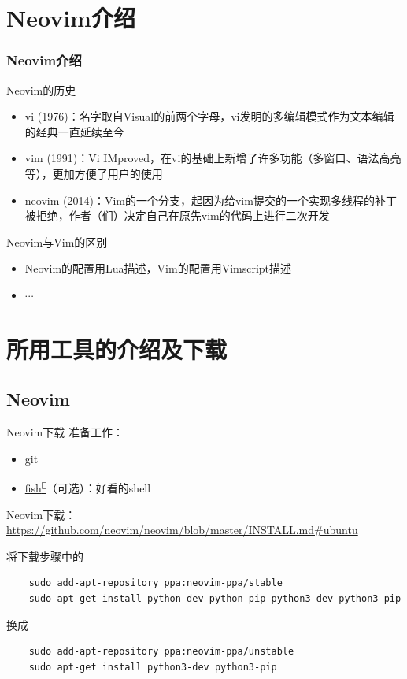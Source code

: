 \documentclass[aspectratio=169]{ctexbeamer}
\newcommand{\nerd}[1]{\texttt{#1}}
\newcommand{\refnote}[1]{\footnotetext{#1}}
\newcommand{\link}[3][]{\href{#3}{#2\textsuperscript{\nerd{}}}}
\begin{document}
\section{Neovim介绍}
  \begin{frame}\frametitle{Neovim介绍}
    Neovim的历史
    \begin{itemize}
      \item vi (1976)：名字取自Visual的前两个字母，vi发明的多编辑模式作为文本编辑的经典一直延续至今 %
      \item vim (1991)：Vi IMproved，在vi的基础上新增了许多功能（多窗口、语法高亮等），更加方便了用户的使用 %
      \item neovim (2014)：Vim的一个分支，起因为给vim提交的一个实现多线程的补丁被拒绝，作者（们）决定自己在原先vim的代码上进行二次开发
    \end{itemize}
    Neovim与Vim的区别
    \begin{itemize}
      \item Neovim的配置用Lua描述，Vim的配置用Vimscript描述
      \item \( \cdots \)
    \end{itemize}

    \refnote{Reference:}
  \end{frame}

\section{所用工具的介绍及下载}
  \subsection{Neovim}
    \begin{frame}[containsverbatim]{Neovim下载}
      准备工作：
      \begin{itemize}
        \item git
        \item \link{fish}{https://fishshell.com/}（可选）：好看的shell
      \end{itemize}

      Neovim下载： \url{https://github.com/neovim/neovim/blob/master/INSTALL.md\#ubuntu}

      将下载步骤中的
      \begin{lstlisting}
    sudo add-apt-repository ppa:neovim-ppa/stable
    sudo apt-get install python-dev python-pip python3-dev python3-pip
      \end{lstlisting}
      换成
      \begin{lstlisting}
    sudo add-apt-repository ppa:neovim-ppa/unstable
    sudo apt-get install python3-dev python3-pip
      \end{lstlisting}
    \end{frame}
\end{document}
